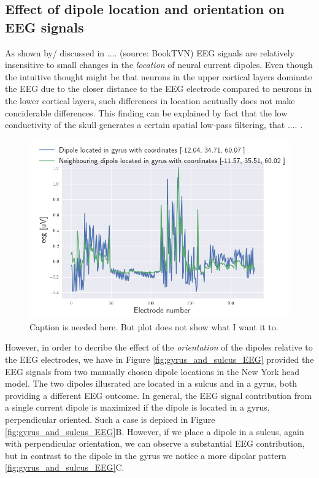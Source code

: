 \documentclass[a4paper, UKenglish, 11pt]{uiomaster}
\begin{document}
\subsection{Effect of dipole location and orientation on EEG signals}
As shown by/ discussed in .... (source: BookTVN) EEG signals are relatively insensitive to small changes in the \emph{location} of neural current dipoles. Even though the intuitive thought might be that neurons in the upper cortical layers dominate the EEG due to the closer distance to the EEG electrode compared to neurons in the lower cortical layers, such differences in location acutually does not make conciderable differences. This finding can be explained by fact that the low conductivity of the skull generates a certain spatial low-pass filtering, that .... .

\begin{figure}[!htb]
    \centering
    \includegraphics[width=\linewidth]{figures/neighbour_dipoles.png}
    \caption{Caption is needed here. But plot does not show what I want it to.}
    \label{fig:neighbour_dipoles}
\end{figure}

However, in order to decribe the effect of the \emph{orientation} of the dipoles relative to the EEG electrodes, we have in Figure \ref{fig:gyrus_and_sulcus_EEG} provided the EEG signals from two manually chosen dipole locations in the New York head model. The two dipoles illusrated are located in a sulcus and in a gyrus, both providing a different EEG outcome. In general, the EEG signal contribution from a single current dipole is maximized if the dipole is located in a gyrus, perpendicular oriented. Such a case is depiced in Figure \ref{fig:gyrus_and_sulcus_EEG}B. However, if we place a dipole in a sulcus, again with perpendicular orientation, we can observe a substantial EEG contribution, but in contrast to the dipole in the gyrus we notice a more dipolar pattern \ref{fig:gyrus_and_sulcus_EEG}C.
\end{document}
